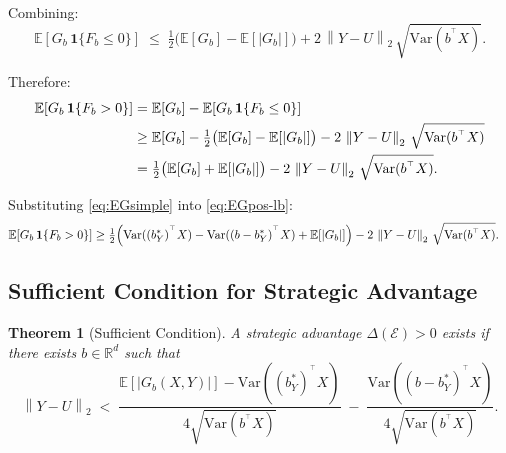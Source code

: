 \documentclass[11pt]{article}
\newtheorem{theorem}{Theorem}[section]
\theoremstyle{definition}
\theoremstyle{remark}
\newcommand{\R}{\mathbb{R}}
\newcommand{\E}{\mathbb{E}}
\newcommand{\norm}[1]{\left\lVert#1\right\rVert}
\newcommand{\T}{^{\top}}
\begin{document}
Combining:
\begin{equation}\label{eq:EGneg-bound}
  \E[G_{b}\,\mathbf{1}\{F_{b}\le 0\}]
  \;\le\;
  \tfrac{1}{2}\bigl(\E[G_{b}]-\E[|G_{b}|]\bigr)
  + 2\,\norm{Y-U}_{2}\,\sqrt{\mathrm{Var}(b^{\T}X)}.
\end{equation}

Therefore:
\begin{align}
  \E[G_{b}\,\mathbf{1}\{F_{b}>0\}]
  &= \E[G_{b}] - \E[G_{b}\,\mathbf{1}\{F_{b}\le 0\}] \notag\\
  &\ge \E[G_{b}] - \tfrac{1}{2}\bigl(\E[G_{b}]-\E[|G_{b}|]\bigr)
       - 2\,\norm{Y-U}_{2}\,\sqrt{\mathrm{Var}(b^{\T}X)} \notag\\
  &= \tfrac{1}{2}\bigl(\E[G_{b}]+\E[|G_{b}|]\bigr)
     - 2\,\norm{Y-U}_{2}\,\sqrt{\mathrm{Var}(b^{\T}X)}. \label{eq:EGpos-lb}
\end{align}

Substituting \eqref{eq:EGsimple} into \eqref{eq:EGpos-lb}:
\begin{align}
  \E[G_{b}\,\mathbf{1}\{F_{b}>0\}]
  &\ge
  \tfrac{1}{2}\Bigl(\mathrm{Var}((b_{Y}^{*})^{\T}X)
                   -\mathrm{Var}((b-b_{Y}^{*})^{\T}X)
                   +\E[|G_{b}|]\Bigr)
  - 2\,\norm{Y-U}_{2}\,\sqrt{\mathrm{Var}(b^{\T}X)}. \label{eq:lb2}
\end{align}

\subsection{Sufficient Condition for Strategic Advantage}

\begin{theorem}[Sufficient Condition]\label{thm:suff}
  A strategic advantage $\Delta(\mathcal{E})>0$ exists if there exists $b\in\R^{d}$ such that
  \begin{equation}\label{eq:suff}
    \norm{Y-U}_{2}
    \;<\;
    \frac{\E[|G_{b}(X,Y)|] - \mathrm{Var}((b_{Y}^{*})^{\T}X)}{4\sqrt{\mathrm{Var}(b^{\T}X)}}
    \;-\;
    \frac{\mathrm{Var}((b-b_{Y}^{*})^{\T}X)}{4\sqrt{\mathrm{Var}(b^{\T}X)}}.
  \end{equation}
\end{theorem}
\end{document}
